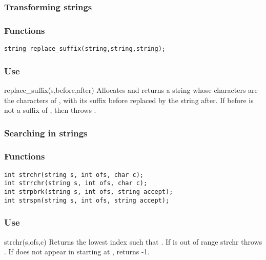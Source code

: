 \subsubsection*{Transforming strings}
\subsubsection*{Functions}
\begin{verbatim}
string replace_suffix(string,string,string);
\end{verbatim}

\subsubsection*{Use}

\begin{defun}{replace_suffix}{(s,before,after)}
Allocates and returns a string whose characters are the characters of
, with its suffix before replaced by the string after.  If before
is not a suffix of , then  throws
.
\end{defun}

\subsubsection*{Searching in strings}
\subsubsection*{Functions}
\begin{verbatim}
int strchr(string s, int ofs, char c);
int strrchr(string s, int ofs, char c);
int strpbrk(string s, int ofs, string accept);
int strspn(string s, int ofs, string accept);
\end{verbatim}

\subsubsection*{Use}

\begin{defun}{strchr}{(s,ofs,c)}
Returns the lowest index  such that
.  If  is out of range strchr
throws .  If  does not
appear in  starting at ,  returns -1.
\end{defun}


